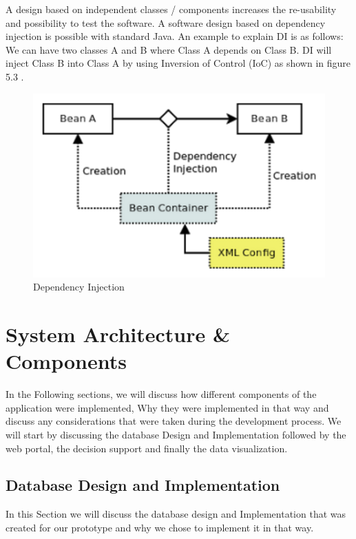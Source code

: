 A design based on independent classes / components increases the re-usability and possibility to test the software. A software design based on dependency injection is possible with standard Java. An example to explain DI is as follows:\\
We can have two classes A and B where Class A depends on Class B. DI will inject Class B into Class A by using Inversion of Control (IoC) as shown in figure 5.3 \cite{DI}.
\begin{figure}[H]
\centering
\includegraphics[scale=0.5]{Images/DI.png}
\caption[Dependency Injection]{Dependency Injection \cite{DI}}
\end{figure}
\section{System Architecture \& Components}
\label{SystemArchitectureAndCompronents}
In the Following sections, we will discuss how different components of the application were implemented, Why they were implemented in that way and discuss any considerations that were taken during the development process. We will start by discussing the database Design and Implementation followed by the web portal, the decision support and finally the data visualization.
\subsection{Database Design and Implementation}
\label{subsec:DatabaseDesignandImplementation}
In this Section we will discuss the database design and Implementation that was created for our prototype and why we chose to implement it in that way.

